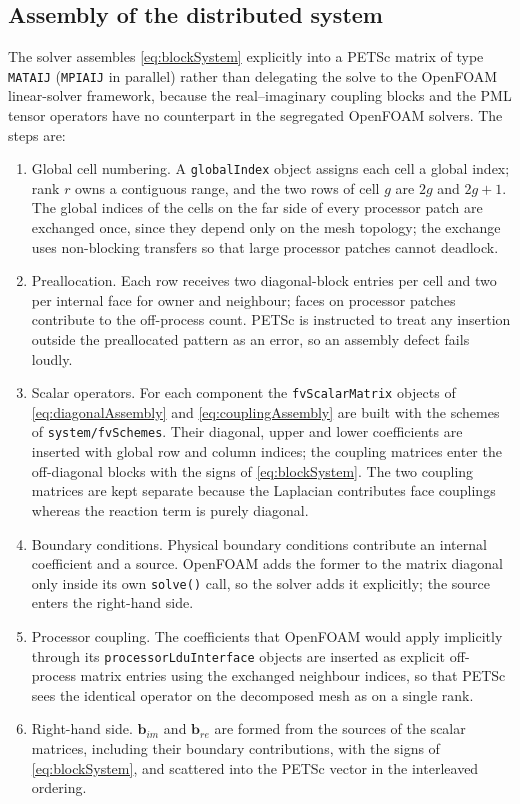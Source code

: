 \documentclass[final,12pt,nopreprintline]{elsarticle}
\newcommand{\code}[1]{\texttt{#1}}
\begin{document}
\subsection{Assembly of the distributed system}
\label{sec:assembly}

The solver assembles \cref{eq:blockSystem} explicitly into a PETSc matrix of
type \code{MATAIJ} (\code{MPIAIJ} in parallel) rather than delegating the
solve to the OpenFOAM linear-solver framework, because the real--imaginary
coupling blocks and the PML tensor operators have no counterpart in the
segregated OpenFOAM solvers.  The steps are:
\begin{enumerate}[leftmargin=*]
    \item Global cell numbering.  A \code{globalIndex} object assigns each
    cell a global index; rank $r$ owns a contiguous range, and the two rows of
    cell $g$ are $2g$ and $2g+1$.  The global indices of the cells on the far
    side of every processor patch are exchanged once, since they depend only
    on the mesh topology; the exchange uses non-blocking transfers so that
    large processor patches cannot deadlock.
    \item Preallocation.  Each row receives two diagonal-block entries per
    cell and two per internal face for owner and neighbour; faces on processor
    patches contribute to the off-process count.  PETSc is instructed to treat
    any insertion outside the preallocated pattern as an error, so an assembly
    defect fails loudly.
    \item Scalar operators.  For each component the \code{fvScalarMatrix}
    objects of \cref{eq:diagonalAssembly} and \cref{eq:couplingAssembly} are
    built with the schemes of \code{system/fvSchemes}.  Their diagonal,
    upper and lower coefficients are inserted with global row and column
    indices; the coupling matrices enter the off-diagonal blocks with the
    signs of \cref{eq:blockSystem}.  The two coupling matrices are kept
    separate because the Laplacian contributes face couplings whereas the
    reaction term is purely diagonal.
    \item Boundary conditions.  Physical boundary conditions contribute an
    internal coefficient and a source.  OpenFOAM adds the former to the
    matrix diagonal only inside its own \code{solve()} call, so the solver
    adds it explicitly; the source enters the right-hand side.
    \item Processor coupling.  The coefficients that OpenFOAM would apply
    implicitly through its \code{processorLduInterface} objects are inserted
    as explicit off-process matrix entries using the exchanged neighbour
    indices, so that PETSc sees the identical operator on the decomposed mesh
    as on a single rank.
    \item Right-hand side.  $\mathbf{b}_{im}$ and $\mathbf{b}_{re}$ are formed
    from the sources of the scalar matrices, including their boundary
    contributions, with the signs of \cref{eq:blockSystem}, and scattered
    into the PETSc vector in the interleaved ordering.
\end{enumerate}
\end{document}

